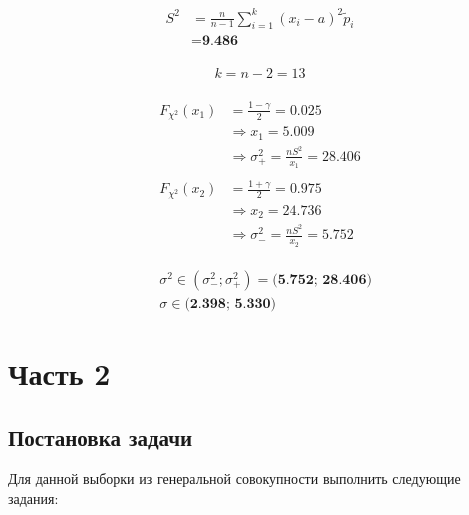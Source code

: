 \documentclass[12pt, a4paper]{article}
\begin{document}
\begin{multicols}{2}
  \null \vfill
  \begin{align*}
    \begin{split}
      S^2 &= \frac{n}{n-1}\sum_{i=1}^{k}(x_i - a)^2\tilde{p}_i \\
          &= \textbf{9.486}
    \end{split}
  \end{align*}
  \vfill \null

  \columnbreak

  \begin{align*}
    k = n - 2 = 13
  \end{align*}

  \begin{align*}
    \begin{split}
      F_{\chi^2}(x_1) &= \frac{1 - \gamma}{2} = 0.025                         \\
                      & \Rightarrow x_1 = 5.009                               \\
                      & \Rightarrow \sigma_{+}^2 = \frac{nS^2}{x_1} = 28.406
    \end{split} \\[1ex]
    \begin{split}
      F_{\chi^2}(x_2) &= \frac{1 + \gamma}{2} = 0.975                         \\
                      & \Rightarrow x_2 = 24.736                              \\
                      & \Rightarrow \sigma_{-}^2 = \frac{nS^2}{x_2} = 5.752
    \end{split}
  \end{align*}

  \begin{align*}
    &\sigma^2 \in (\sigma_{-}^2; \sigma_{+}^2) = \textbf{(5.752; 28.406)} \\
    &\sigma \in \textbf{(2.398; 5.330)}
  \end{align*}
\end{multicols}

\section{Часть 2}
\subsection{Постановка задачи}
Для данной выборки из генеральной совокупности выполнить следующие задания:
\end{document}
